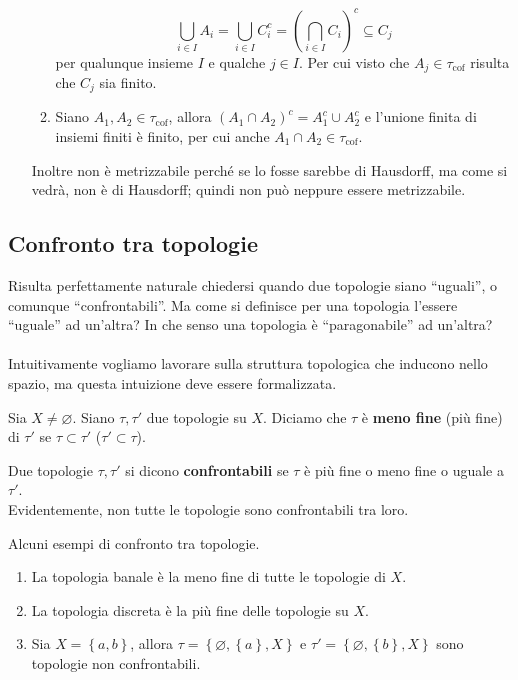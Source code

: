 \begin{example}
\begin{enumerate}
\begin{enumerate}
			\begin{equation*}
					\bigcup_{i \in I} A_i = \bigcup_{i \in I} C_i^c = \left(\bigcap_{i \in I} C_i\right)^c \subseteq C_j
			\end{equation*}
		per qualunque insieme $I$ e qualche $j \in I$. Per cui visto che $A_j \in \tau_{\text{cof}}$ risulta che $C_j$ sia finito.
		\item Siano $A_1, A_2 \in \tau_{\text{cof}}$, allora $(A_1 \cap A_2)^c = A^c_1 \cup A^c_2$ e l'unione finita di insiemi finiti è finito, per cui anche $A_1 \cap A_2 \in \tau_{\text{cof}}$. 
	\end{enumerate}	
	Inoltre non è metrizzabile perché se lo fosse sarebbe di Hausdorff, ma come si vedrà, non è di Hausdorff; quindi non può neppure essere metrizzabile.
\end{enumerate}
\end{example}



\subsection{\textcolor{TopGener}{\textbf{Confronto tra topologie}}}

Risulta perfettamente naturale chiedersi quando due topologie siano \enquote{uguali}, o comunque \enquote{confrontabili}. Ma come si definisce per una topologia l'essere \enquote{uguale} ad un'altra? In che senso una topologia è \enquote{paragonabile} ad un'altra? \\ \\ Intuitivamente vogliamo lavorare sulla struttura topologica che inducono nello spazio, ma questa intuizione deve essere formalizzata.



\begin{definition}
	Sia $X \neq \varnothing$. Siano $\tau, \tau'$ due topologie su $X$. Diciamo che $\tau$ è \textbf{meno fine} (più fine) di $\tau'$ se $\tau \subset \tau'$ ($\tau' \subset \tau$).
\end{definition}

\begin{definition}
	Due topologie $\tau, \tau'$ si dicono \textbf{confrontabili} se $\tau$ è più fine o meno fine o uguale a $\tau'$. \\ Evidentemente, non tutte le topologie sono confrontabili tra loro.
\end{definition}

\begin{example}
	Alcuni esempi di confronto tra topologie.
	\begin{enumerate}
		\item La topologia banale è la meno fine di tutte le topologie di $X$.
		\item La topologia discreta è la più fine delle topologie su $X$.
		\item Sia $X = \left\{a,b\right\}$, allora $\tau = \left\{\varnothing,\left\{a\right\}, X\right\}$ e $\tau' = \left\{\varnothing, \left\{b\right\}, X\right\}$ sono topologie non confrontabili.
	\end{enumerate}
\end{example}



